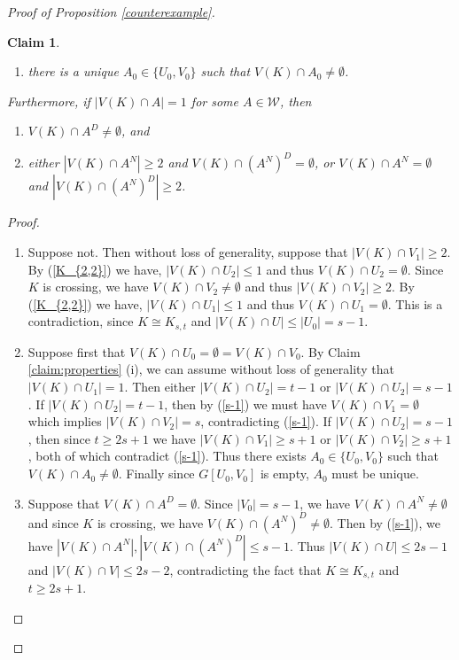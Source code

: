 \documentclass[oneside,12pt]{memoir}
\newtheorem{claim}[theorem]{Claim}
\begin{document}
\begin{proof}[Proof of Proposition \ref{counterexample}]
\begin{claim}
\begin{enumerate}
\item there is a unique $A_0\in \{U_0, V_0\}$ such that $V(K)\cap A_0\neq \emptyset$.
\end{enumerate}
Furthermore, if $|V(K)\cap A|=1$ for some $A\in \mathcal{W}$, then 
\begin{enumerate}[resume]
\item $V(K)\cap A^D\neq \emptyset$, and

\item either $|V(K)\cap A^N|\geq 2$ and $V(K)\cap (A^N)^D=\emptyset$, or $V(K)\cap A^N=\emptyset$ and $|V(K)\cap (A^N)^D|\geq 2$.

\end{enumerate}

\end{claim}

\begin{proof}
\begin{enumerate}
\item Suppose not. Then without loss of generality, suppose that $|V(K)\cap V_1|\geq 2$. By (\ref{K_{2,2}}) we have, $|V(K)\cap U_2|\leq 1$ and thus $V(K)\cap U_2=\emptyset$.  Since $K$ is crossing, we have $V(K)\cap V_2\neq \emptyset$ and thus $|V(K)\cap V_2|\geq 2$. By (\ref{K_{2,2}}) we have, $|V(K)\cap U_1|\leq 1$ and thus $V(K)\cap U_1=\emptyset$.  This is a contradiction, since $K\cong K_{s,t}$ and $|V(K)\cap U|\leq |U_0|=s-1$.

\item Suppose first that $V(K)\cap U_0=\emptyset=V(K)\cap V_0$.  By Claim \ref{claim:properties} (i), we can assume without loss of generality that $|V(K)\cap U_1|=1$.  Then either $|V(K)\cap U_2|=t-1$ or $|V(K)\cap U_2|=s-1$.  If $|V(K)\cap U_2|=t-1$, then by (\ref{s-1}) we must have $V(K)\cap V_1=\emptyset$ which implies $|V(K)\cap V_2|=s$, contradicting (\ref{s-1}).  If $|V(K)\cap U_2|=s-1$, then since $t\geq 2s+1$ we have $|V(K)\cap V_1|\geq s+1$ or $|V(K)\cap V_2|\geq s+1$, both of which contradict (\ref{s-1}).  Thus there exists $A_0\in \{U_0, V_0\}$ such that $V(K)\cap A_0\neq \emptyset$.  Finally since $G[U_0, V_0]$ is empty, $A_0$ must be unique.

\item Suppose that $V(K)\cap A^D=\emptyset$. Since $|V_0|=s-1$, we have $V(K)\cap A^N\neq \emptyset$ and since $K$ is crossing, we have $V(K)\cap (A^N)^D\neq \emptyset$.  Then by (\ref{s-1}), we have $|V(K)\cap A^N|, |V(K)\cap (A^N)^D|\leq s-1$.  Thus $|V(K)\cap U|\leq 2s-1$ and $|V(K)\cap V|\leq 2s-2$, contradicting the fact that $K\cong K_{s,t}$ and $t\geq 2s+1$.


\end{enumerate}
\end{proof}
\end{proof}
\end{document}
